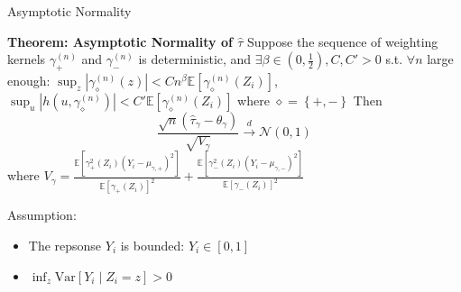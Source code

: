  \begin{frame}{Asymptotic Normality}
    \begin{block}{\textbf{Theorem: Asymptotic Normality of $\hat{\tau}$}}
        \small
        Suppose the sequence of weighting kernels $\gamma_{+}^{\left(n\right)}$ and $\gamma_{-}^{\left(n\right)}$ is deterministic, and  $\exists\beta\in\left(0,\frac{1}{2}\right), C,C'>0$ s.t. $\forall n$ large enough: $\sup_{z}\left|\gamma_{\diamond}^{\left(n\right)}\left(z\right)\right| <Cn^{\beta}  \mathbb{E} \left[\gamma_{\diamond}^{\left(n\right)}\left(Z_{i}\right)\right]$, $\sup_{u}\left|h\left(u,\gamma_{\diamond}^{\left(n\right)}\right)\right| <C'\mathbb{E}\left[\gamma_{\diamond}^{\left(n\right)}\left(Z_{i}\right)\right]$ where $\diamond=\left\{ +,-\right\}$
        Then 
        $$
        \frac{\sqrt{n}\left(\hat{\tau}_{\gamma}-\theta_{\gamma}\right)}{\sqrt{V_{\gamma}}}\xrightarrow{d}\mathcal{N}\left(0,1\right)
        $$
        where $V_{\gamma}=\frac{\mathbb{E}\left[\gamma_{+}^{2}\left(Z_{i}\right)\left(Y_{i}-\mu_{\gamma,+}\right)^{2}\right]}{\mathbb{E}\left[\gamma_{+}\left(Z_{i}\right)\right]^{2}}+\frac{\mathbb{E}\left[\gamma_{-}^{2}\left(Z_{i}\right)\left(Y_{i}-\mu_{\gamma,-}\right)^{2}\right]}{\mathbb{E}\left[\gamma_{-}\left(Z_{i}\right)\right]^{2}}$
    \end{block}

    \vspace*{5pt}
    Assumption:
    \begin{itemize}
        \item The repsonse $Y_i$ is bounded: $Y_i \in [0,1]$
        \item $\inf_z\mathrm{Var}\left[Y_i\mid Z_i=z\right]>0$
    \end{itemize}
    \vspace*{5pt}
 \end{frame}

